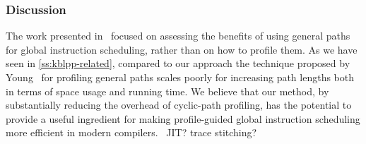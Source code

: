 \subsubsection*{Discussion}
The work presented in~\cite{Young98} focused on assessing the benefits of using general paths for global instruction scheduling, rather than on how to profile them. As we have seen in \mysection\ref{ss:kblpp-related}, compared to our approach the technique proposed by Young~\cite{Young98thesis} for profiling general paths scales poorly for increasing path lengths both in terms of space usage and running time. %
We believe that our method, by substantially reducing the overhead of cyclic-path profiling, has the potential to provide a useful ingredient for making profile-guided global instruction scheduling more efficient in modern compilers.
\missing\ JIT? trace stitching?
